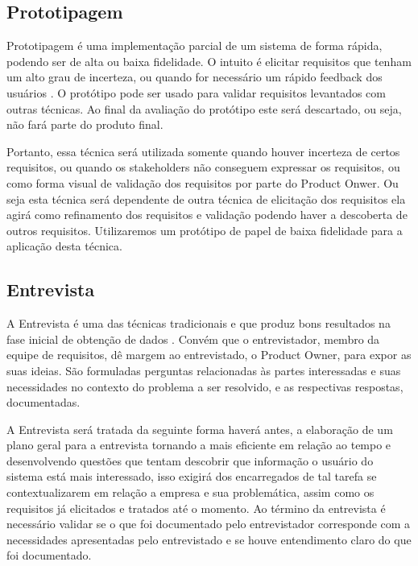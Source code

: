 \subsection{Prototipagem}
Prototipagem é uma implementação parcial de um sistema de forma rápida, podendo ser de alta ou baixa fidelidade. O intuito é elicitar requisitos que tenham um alto grau de incerteza, ou quando for necessário um rápido feedback dos usuários \cite{sommerville1995}. O protótipo pode ser usado para validar requisitos levantados com outras técnicas. Ao final da avaliação do protótipo este será descartado, ou seja, não fará parte do produto final.

Portanto, essa técnica será utilizada somente quando houver incerteza de certos requisitos, ou quando os stakeholders não conseguem expressar os requisitos, ou como forma visual de validação dos requisitos por parte do Product Onwer. Ou seja esta técnica será dependente de outra técnica de elicitação dos requisitos ela agirá como refinamento dos requisitos e validação podendo haver a descoberta de outros requisitos.    Utilizaremos um protótipo de papel de baixa fidelidade para a aplicação desta técnica.

\subsection{Entrevista}
A Entrevista é uma das técnicas tradicionais e que produz bons resultados na fase inicial de obtenção de dados \cite{leffingwell2011}. Convém que o entrevistador, membro da equipe de requisitos, dê margem ao entrevistado, o Product Owner, para expor as suas ideias. São formuladas perguntas relacionadas às partes interessadas e suas necessidades no contexto do problema a ser resolvido, e as respectivas respostas, documentadas. 

A Entrevista será tratada da seguinte forma haverá antes, a elaboração de um plano geral para a entrevista tornando a mais eficiente em relação ao tempo e desenvolvendo questões que tentam descobrir que informação o usuário do sistema está mais interessado, isso exigirá dos encarregados de tal tarefa se contextualizarem em relação a empresa e sua problemática, assim como os requisitos já elicitados e tratados até o momento. Ao término da entrevista é necessário validar se o que foi documentado pelo entrevistador corresponde com a necessidades apresentadas pelo entrevistado e se houve entendimento claro do que foi documentado. 

